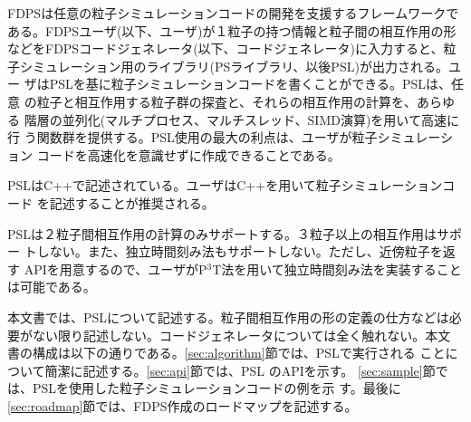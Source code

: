 FDPSは任意の粒子シミュレーションコードの開発を支援するフレームワークで
ある。FDPSユーザ(以下、ユーザ)が１粒子の持つ情報と粒子間の相互作用の形
などをFDPSコードジェネレータ(以下、コードジェネレータ)に入力すると、粒
子シミュレーション用のライブラリ(PSライブラリ、以後PSL)が出力される。ユー
ザはPSLを基に粒子シミュレーションコードを書くことができる。PSLは、任意
の粒子と相互作用する粒子群の探査と、それらの相互作用の計算を、あらゆる
階層の並列化(マルチプロセス、マルチスレッド、SIMD演算)を用いて高速に行
う関数群を提供する。PSL使用の最大の利点は、ユーザが粒子シミュレーション
コードを高速化を意識せずに作成できることである。

PSLはC++で記述されている。ユーザはC++を用いて粒子シミュレーションコード
を記述することが推奨される。

PSLは２粒子間相互作用の計算のみサポートする。３粒子以上の相互作用はサポー
トしない。また、独立時間刻み法もサポートしない。ただし、近傍粒子を返す
APIを用意するので、ユーザがP$^3$T法を用いて独立時間刻み法を実装すること
は可能である。

本文書では、PSLについて記述する。粒子間相互作用の形の定義の仕方などは必
要がない限り記述しない。コードジェネレータについては全く触れない。本文
書の構成は以下の通りである。\ref{sec:algorithm}節では、PSLで実行される
ことについて簡潔に記述する。\ref{sec:api}節では、PSL のAPIを示す。
\ref{sec:sample}節では、PSLを使用した粒子シミュレーションコードの例を示
す。最後に\ref{sec:roadmap}節では、FDPS作成のロードマップを記述する。
